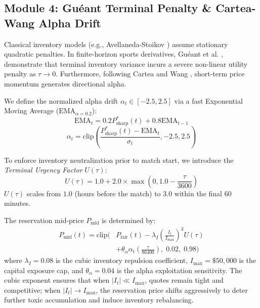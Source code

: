 \documentclass[10pt,twocolumn]{article}
\begin{document}
\subsection{Module 4: Guéant Terminal Penalty \& Cartea-Wang Alpha Drift}

Classical inventory models (e.g., Avellaneda-Stoikov \cite{4}) assume stationary quadratic penalties. In finite-horizon sports derivatives, Guéant et al. \cite{2}, \cite{15} demonstrate that terminal inventory variance incurs a severe non-linear utility penalty as $\tau \to 0$. Furthermore, following Cartea and Wang \cite{1}, short-term price momentum generates directional alpha.

We define the normalized alpha drift $\alpha_t \in [-2.5, 2.5]$ via a fast Exponential Moving Average ($\text{EMA}_{\alpha=0.2}$):
\begin{equation}
\text{EMA}_t = 0.2 P^*_{\text{sharp}}(t) + 0.8 \text{EMA}_{t-1}
\end{equation}
\begin{equation}
\alpha_t = \text{clip}\left(\frac{P^*_{\text{sharp}}(t) - \text{EMA}_t}{\sigma_t}, -2.5, 2.5\right)
\end{equation}

To enforce inventory neutralization prior to match start, we introduce the \textit{Terminal Urgency Factor} $U(\tau)$:
\begin{equation}
U(\tau) = 1.0 + 2.0 \times \max\left(0, 1.0 - \frac{\tau}{3600}\right)
\end{equation}
$U(\tau)$ scales from $1.0$ (hours before the match) to $3.0$ within the final 60 minutes.

The reservation mid-price $P_{\text{mid}}$ is determined by:
\begin{equation}
\begin{aligned}
P_{\text{mid}}(t) = \text{clip}\Bigg(&P_{\text{fair}}(t) - \lambda_I \left(\frac{I_t}{I_{\max}}\right)^3 U(\tau) \\
&+ \theta_{\alpha} \alpha_t \left(\frac{\tau}{86400}\right), \; 0.02, \; 0.98\Bigg)
\end{aligned}
\end{equation}
where $\lambda_I = 0.08$ is the cubic inventory repulsion coefficient, $I_{\max} = \$50,000$ is the capital exposure cap, and $\theta_{\alpha} = 0.04$ is the alpha exploitation sensitivity. The cubic exponent ensures that when $|I_t| \ll I_{\max}$, quotes remain tight and competitive; when $|I_t| \to I_{\max}$, the reservation price shifts aggressively to deter further toxic accumulation and induce inventory rebalancing.
\end{document}
